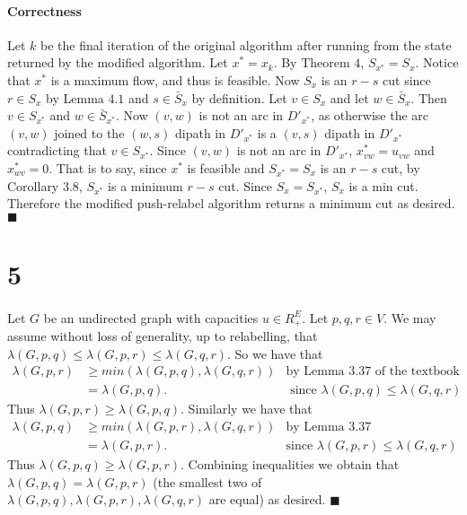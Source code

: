 \documentclass[letterpaper,12pt,oneside,onecolumn]{article}
\begin{document}
\paragraph{Correctness}
Let $k$ be the final iteration of the original algorithm after running from the state returned by the modified algorithm. Let $x^* = x_k$. By Theorem $4$, $S_{x^*} = S_x$. Notice that $x^*$ is a maximum flow, and thus is feasible. Now $S_x$ is an $r-s$ cut since $r \in S_x$ by Lemma $4.1$ and $s \in \bar{S}_x$ by definition. Let $v \in S_x$ and let $w \in \bar{S}_x$. Then $v \in S_{x^*}$ and $w \in \bar{S}_{x^*}$. Now $(v,w)$ is not an arc in $D'_{x^*}$, as otherwise the arc $(v,w)$ joined to the $(w,s)$ dipath in $D'_{x^*}$ is a $(v,s)$ dipath in $D'_{x^*}$ contradicting that $v \in S_{x^*}$. Since $(v,w)$ is not an arc in $D'_{x^*}$, $x^*_{vw} = u_{vw}$ and $x^*_{wv} = 0$. That is to say, since $x^*$ is feasible and $S_{x^*} = S_x$ is an $r-s$ cut, by Corollary $3.8$, $S_{x^*}$ is a minimum $r-s$ cut. Since $S_x = S_{x^*}$, $S_x$ is a min cut. Therefore the modified push-relabel algorithm returns a minimum cut as desired. $\blacksquare$

\section*{5}
\paragraph{}
Let $G$ be an undirected graph with capacities $u \in R_+^E$. Let $p,q,r \in V$. We may assume without loss of generality, up to relabelling, that $\lambda(G,p,q) \leq \lambda(G,p,r) \leq \lambda(G,q,r)$. So we have that 
\begin{align*}
\lambda(G,p,r) &\geq min(\lambda(G,p,q), \lambda(G,q,r)) &\text{by Lemma $3.37$ of the textbook}\\
&= \lambda(G,p,q). &\text{ since $\lambda(G,p,q) \leq \lambda(G,q,r)$}
\end{align*} 
Thus $\lambda(G,p,r) \geq \lambda(G,p,q)$. Similarly we have that
\begin{align*}
\lambda(G,p,q) &\geq min(\lambda(G,p,r), \lambda(G,q,r)) &\text{by Lemma $3.37$}\\
&= \lambda(G,p,r). &\text{since $\lambda(G,p,r) \leq \lambda(G,q,r)$}
\end{align*}
Thus $\lambda(G,p,q) \geq \lambda(G,p,r)$. Combining inequalities we obtain that $\lambda(G,p,q) = \lambda(G,p,r)$ (the smallest two of $\lambda(G,p,q),\lambda(G,p,r),\lambda(G,q,r)$ are equal) as desired. $\blacksquare$
\end{document}
